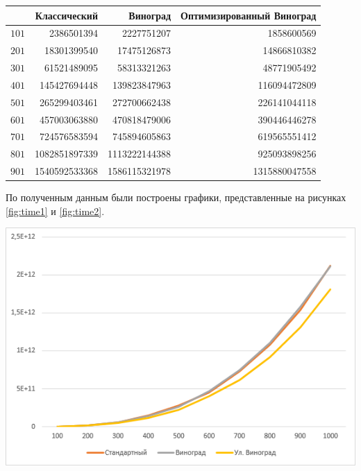 \documentclass[12pt,a4paper]{scrartcl}
\begin{document}
\begin{table}[ht]
	\label{time1}
	\centering
	\begin{tabular}{|r|r|r|r|}         
		\cline{1-4} & {Классический} & {Виноград} & {Оптимизированный Виноград} \\
		\hline $101$ &	2386501394 & 2227751207 & 1858600569\\
		\hline $201$ &	18301399540 & 17475126873 & 14866810382\\
		\hline $301$ & 61521489095 & 58313321263 & 48771905492\\
		\hline $401$ &	145427694448 & 139823847963 & 116094472809\\
		\hline $501$ &	265299403461 & 272700662438 & 226141044118\\
		\hline $601$ &	457003063880 & 470818479006 & 390446446278\\
		\hline $701$ &	724576583594 & 745894605863 & 619565551412\\
		\hline $801$ &	1082851897339 & 1113222144388 & 925093898256\\
		\hline $901$ & 1540592533368 & 1586115321978 & 1315880047558\\
		\hline
	\end{tabular}
\end{table}


По полученным данным были построены графики, представленные на рисунках \ref{fig:time1} и \ref{fig:time2}.

\begin{center}
	\includegraphics[scale=0.65]{time2.png}
	\label{fig:time2}
\end{center}
\end{document}
